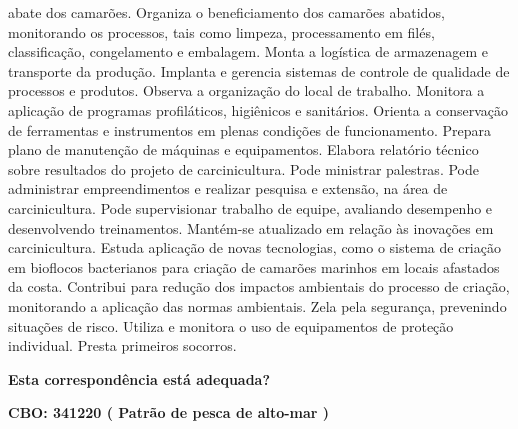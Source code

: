 \documentclass[
]{article}
\begin{document}
abate dos camarões. Organiza o beneficiamento dos camarões abatidos,
monitorando os processos, tais como limpeza, processamento em filés,
classificação, congelamento e embalagem. Monta a logística de
armazenagem e transporte da produção. Implanta e gerencia sistemas de
controle de qualidade de processos e produtos. Observa a organização do
local de trabalho. Monitora a aplicação de programas profiláticos,
higiênicos e sanitários. Orienta a conservação de ferramentas e
instrumentos em plenas condições de funcionamento. Prepara plano de
manutenção de máquinas e equipamentos. Elabora relatório técnico sobre
resultados do projeto de carcinicultura. Pode ministrar palestras. Pode
administrar empreendimentos e realizar pesquisa e extensão, na área de
carcinicultura. Pode supervisionar trabalho de equipe, avaliando
desempenho e desenvolvendo treinamentos. Mantém-se atualizado em relação
às inovações em carcinicultura. Estuda aplicação de novas tecnologias,
como o sistema de criação em bioflocos bacterianos para criação de
camarões marinhos em locais afastados da costa. Contribui para redução
dos impactos ambientais do processo de criação, monitorando a aplicação
das normas ambientais. Zela pela segurança, prevenindo situações de
risco. Utiliza e monitora o uso de equipamentos de proteção individual.
Presta primeiros socorros.

\begin{Form}
\textbf{Esta correspondência está adequada?} \\ 
\end{Form}

\textbf{CBO: 341220  ( Patrão de pesca de alto-mar )}
\end{document}
